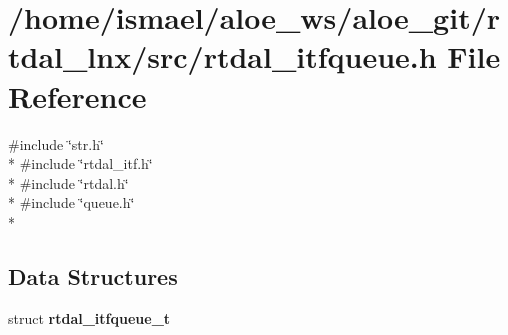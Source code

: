 \section{/home/ismael/aloe\-\_\-ws/aloe\-\_\-git/rtdal\-\_\-lnx/src/rtdal\-\_\-itfqueue.h File Reference}
\label{rtdal__itfqueue_8h}
{\ttfamily \#include \char`\"{}str.\-h\char`\"{}}\\*
{\ttfamily \#include \char`\"{}rtdal\-\_\-itf.\-h\char`\"{}}\\*
{\ttfamily \#include \char`\"{}rtdal.\-h\char`\"{}}\\*
{\ttfamily \#include \char`\"{}queue.\-h\char`\"{}}\\*
\subsection*{Data Structures}
\begin{DoxyCompactItemize}
\item 
struct {\bf rtdal\-\_\-itfqueue\-\_\-t}
\end{DoxyCompactItemize}
